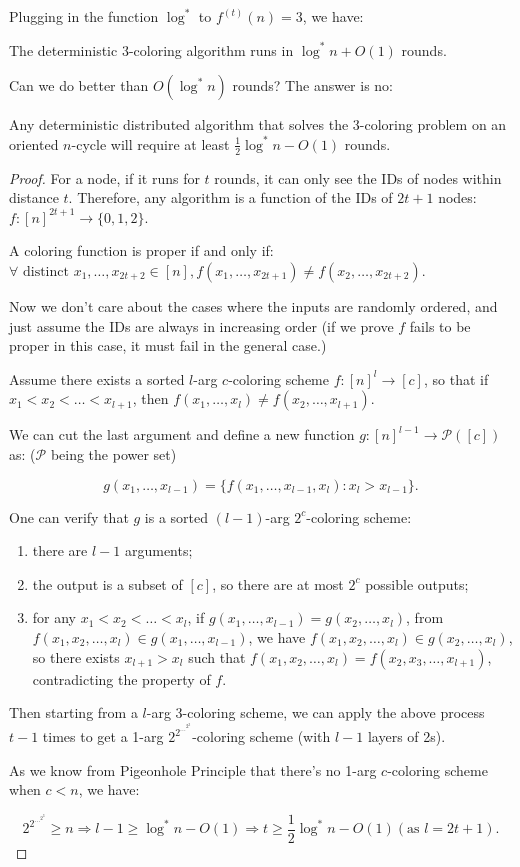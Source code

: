 Plugging in the function $\log^*$ to $f^{(t)}(n) = 3$, we have:
\begin{theorem}
	The deterministic 3-coloring algorithm runs in $\log^* n + O(1)$ rounds.
\end{theorem}

Can we do better than $O(\log^* n)$ rounds? The answer is no:

\begin{theorem}
	Any deterministic distributed algorithm that solves the 3-coloring problem on an oriented $n$-cycle will require at least $\frac{1}{2}\log^* n - O(1)$ rounds.
\end{theorem}
\begin{proof}
	For a node, if it runs for $t$ rounds, it can only see the IDs of nodes within distance $t$.
	Therefore, any algorithm is a function of the IDs of $2t+1$ nodes: $f: [n]^{2t+1} \to \{0,1,2\}$.

	A coloring function is proper if and only if: $\forall \text{ distinct } x_1, \ldots, x_{2t+2} \in [n], f(x_1, \ldots, x_{2t+1}) \neq f(x_2, \ldots, x_{2t+2})$.

	Now we don't care about the cases where the inputs are randomly ordered, and just assume the IDs are always in increasing order (if we prove $f$ fails to be proper in this case, it must fail in the general case.)

	Assume there exists a sorted $l$-arg $c$-coloring scheme $f: [n]^l \to [c]$, so that if $x_1 < x_2 < \ldots < x_{l+1}$, then $f(x_1, \ldots, x_l) \neq f(x_2, \ldots, x_{l+1})$.

	We can cut the last argument and define a new function $g: [n]^{l-1} \to \mathcal P([c])$ as: ($\mathcal P$ being the power set)

	\[
		g(x_1, \ldots, x_{l-1}) = \{f(x_1, \ldots, x_{l-1}, x_l) : x_l > x_{l-1}\}.
	\]

	One can verify that $g$ is a sorted $(l-1)$-arg $2^{c}$-coloring scheme:

	\begin{enumerate}
		\item there are $l-1$ arguments;
		\item the output is a subset of $[c]$, so there are at most $2^c$ possible outputs;
		\item for any $x_1 < x_2 < \ldots < x_l$, if $g(x_1, \ldots, x_{l-1}) = g(x_2, \ldots, x_l)$, from $f(x_1,x_2,\ldots,x_l) \in g(x_1,\ldots,x_{l-1})$, we have $f(x_1,x_2,\ldots,x_l) \in g(x_2,\ldots,x_l)$, so there exists $x_{l+1} > x_l$ such that $f(x_1,x_2,\ldots,x_l) = f(x_2,x_3,\ldots,x_{l+1})$, contradicting the property of $f$.
	\end{enumerate}

	Then starting from a $l$-arg 3-coloring scheme, we can apply the above process $t-1$ times to get a 1-arg $2^{2^{\ldots^{2^3}}}$-coloring scheme (with $l-1$ layers of 2s).

	As we know from Pigeonhole Principle that there's no 1-arg $c$-coloring scheme when $c < n$, we have:

	\[2^{2^{\ldots^{2^3}}} \geq n \Rightarrow l - 1 \geq \log^* n - O(1) \Rightarrow t \geq \frac{1}{2}\log^* n - O(1) (\text{as }l = 2t+1).
	\]
\end{proof}

